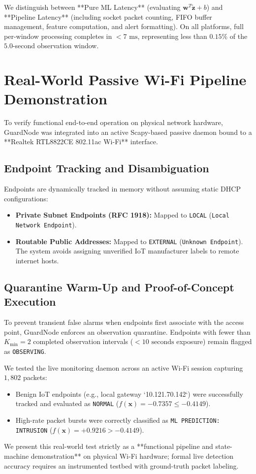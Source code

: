 \documentclass[conference]{IEEEtran}
\begin{document}
We distinguish between **Pure ML Latency** (evaluating $\mathbf{w}^T \tilde{\mathbf{z}} + b$) and **Pipeline Latency** (including socket packet counting, FIFO buffer management, feature computation, and alert formatting). On all platforms, full per-window processing completes in $< 7\text{ ms}$, representing less than $0.15\%$ of the $5.0$-second observation window.

\section{Real-World Passive Wi-Fi Pipeline Demonstration}

To verify functional end-to-end operation on physical network hardware, GuardNode was integrated into an active Scapy-based passive daemon bound to a **Realtek RTL8822CE 802.11ac Wi-Fi** interface.

\subsection{Endpoint Tracking and Disambiguation}
Endpoints are dynamically tracked in memory without assuming static DHCP configurations:
\begin{itemize}
    \item \textbf{Private Subnet Endpoints (RFC 1918):} Mapped to \texttt{LOCAL} (\texttt{Local Network Endpoint}).
    \item \textbf{Routable Public Addresses:} Mapped to \texttt{EXTERNAL} (\texttt{Unknown Endpoint}). The system avoids assigning unverified IoT manufacturer labels to remote internet hosts.
\end{itemize}

\subsection{Quarantine Warm-Up and Proof-of-Concept Execution}
To prevent transient false alarms when endpoints first associate with the access point, GuardNode enforces an observation quarantine. Endpoints with fewer than $K_{\min} = 2$ completed observation intervals ($< 10\text{ seconds}$ exposure) remain flagged as \texttt{OBSERVING}.

We tested the live monitoring daemon across an active Wi-Fi session capturing $1,802$ packets:
\begin{itemize}
    \item Benign IoT endpoints (e.g., local gateway `10.121.70.142`) were successfully tracked and evaluated as \texttt{NORMAL} ($f(\mathbf{x}) = -0.7357 \le -0.4149$).
    \item High-rate packet bursts were correctly classified as \texttt{ML PREDICTION: INTRUSION} ($f(\mathbf{x}) = +0.9216 > -0.4149$).
\end{itemize}
We present this real-world test strictly as a **functional pipeline and state-machine demonstration** on physical Wi-Fi hardware; formal live detection accuracy requires an instrumented testbed with ground-truth packet labeling.
\end{document}
